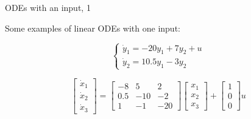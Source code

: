 \documentclass{beamer}
\begin{document}
\begin{frame}{ODEs with an input, 1}
	\begin{flushleft}
		
		Some examples of linear ODEs with one input:
		
		
		\begin{example}
			\begin{equation}
				\begin{cases}
					\dot{y}_1 = -20 y_1 + 7 y_2 + u \\
					\dot{y}_2 = 10.5 y_1 - 3 y_2
				\end{cases}
			\end{equation}
		\end{example}
		
		\begin{example}
			\begin{equation}
				\begin{bmatrix}
					\dot{x}_1 \\
					\dot{x}_2 \\
					\dot{x}_3
				\end{bmatrix} 
				= 
				\begin{bmatrix}
					-8   & 5   & 2  \\
					0.5 & -10 & -2 \\
					1   & -1 & -20
				\end{bmatrix}
				\begin{bmatrix}
					x_1 \\
					x_2 \\
					x_3
				\end{bmatrix} 
			+
			\begin{bmatrix}
				1    \\
				0    \\
				0   
			\end{bmatrix}
			u
			\end{equation}
		\end{example}
		
	\end{flushleft}
\end{frame}
\end{document}
